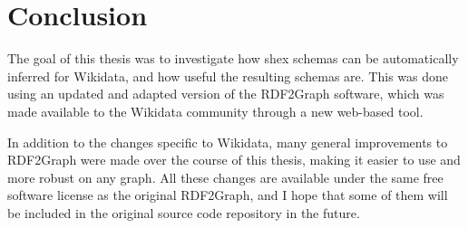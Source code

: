
\chapter{Conclusion}
\label{ch:Conclusion}

The goal of this thesis was to investigate how \gls{shex} schemas can be automatically inferred for Wikidata,
and how useful the resulting schemas are.
This was done using an updated and adapted version of the RDF2Graph software,
which was made available to the Wikidata community
through a new web-based tool.

In addition to the changes specific to Wikidata,
many general improvements to RDF2Graph were made over the course of this thesis,
making it easier to use and more robust on any graph.
All these changes are available under the same free software license as the original RDF2Graph,
and I hope that some of them will be included in the original source code repository in the future.

